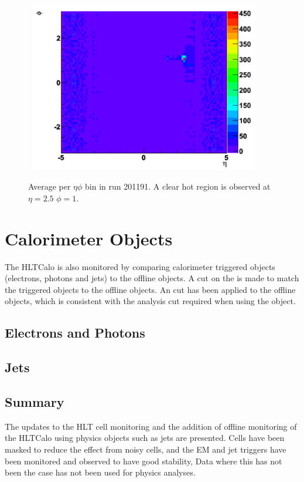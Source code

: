 \begin{figure}
\centering
\mbox{
   \includegraphics[width=0.9\textwidth]{figures/ServiceWork/Cells_HotSpot.pdf}
}
\caption[Average \et{} for HLT calorimeter cells]{
Average \et{} per $\eta \phi$ bin in run 201191. 
A clear hot region is observed at $\eta=2.5$ $\phi=1$. 
\label{SW_hotspot}}
\end{figure}



\section{Calorimeter Objects}

The HLTCalo is also monitored by comparing calorimeter triggered objects (electrons, photons and jets) to the offline objects.
A cut on the \dr{} is made to match the triggered objects to the offline objects.
An \et{} cut has been applied to the offline objects, which is consistent with the analysis cut required when using the object. 



\subsection{Electrons and Photons}




 
\subsection{Jets}
\label{HLTCalo:Jets}




\subsection{Summary}

The updates to the HLT cell monitoring and the addition of offline monitoring of the HLTCalo using physics objects such as jets are presented.
Cells have been masked to reduce the effect from noisy cells, and the EM and jet triggers have been monitored and observed to have good stability, 
Data where this has not been the case has not been used for physics analyses.
